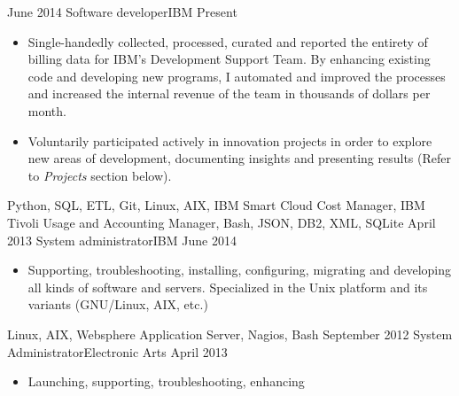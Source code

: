 %
%
%

\begin{experiences}
  \experience
    {June 2014}   {Software developer}{IBM}
    {Present} {
                \begin{itemize}
                  \item Single-handedly collected, processed, curated and 
                  reported the entirety of billing data for IBM's Development 
                  Support Team. By enhancing existing code and developing new 
                  programs, I automated and improved the processes and 
                  increased the internal revenue of the team in thousands of 
                  dollars per month.
                  \item Voluntarily participated actively in innovation 
                  projects in order to explore new areas of development, 
                  documenting insights and presenting results (Refer to 
                  \emph{Projects} section below).
                \end{itemize}
              }
              {Python, SQL, ETL, Git, Linux, AIX, IBM Smart Cloud Cost Manager, 
              IBM Tivoli Usage and Accounting Manager, Bash, JSON, DB2, 
              XML, SQLite}
  \emptySeparator
  \experience
    {April 2013} {System administrator}{IBM}
    {June 2014}    {
                      \begin{itemize}
                        \item Supporting, troubleshooting, installing, 
                        configuring, migrating and developing all kinds of 
                        software and servers. Specialized in the Unix platform 
                        and its variants (GNU/Linux, AIX, etc.)
                      \end{itemize}
                    }
                    {Linux, AIX, Websphere Application Server, Nagios, Bash}
  \emptySeparator
  \experience
  {September 2012}  {System Administrator}{Electronic Arts}
  {April 2013}   {
                      \begin{itemize}
                        \item Launching, supporting, troubleshooting, enhancing 

\end{itemize}}
\end{experiences}
